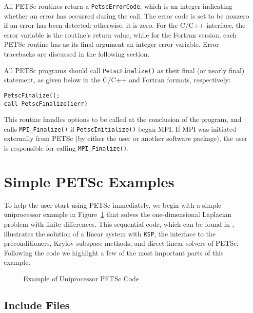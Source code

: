 {{All PETSc routines return a \lstinline{PetscErrorCode}, which is an integer indicating whether an error has
occurred during the call.  The error code is set to be nonzero if an
error has been detected; otherwise, it is zero.  For the C/C++
interface, the error variable is the routine's return value, while for
the Fortran version, each PETSc routine has as its final argument an
integer error variable.  Error tracebacks are discussed in the following
section.

All PETSc programs should call \lstinline{PetscFinalize()}
as their final (or nearly final) statement, as given below in the C/C++
and Fortran formats, respectively:
\begin{lstlisting}
PetscFinalize();
call PetscFinalize(ierr)
\end{lstlisting}
This routine handles options to be called at the conclusion of
the program, and calls \lstinline{MPI_Finalize()} 
if \lstinline{PetscInitialize()}
began MPI. If MPI was initiated externally from PETSc (by either
the user or another software package), the user is
responsible for calling \lstinline{MPI_Finalize()}.

\section{Simple PETSc Examples}

\label{sec_simple}

To help the user start using PETSc immediately, we begin with a simple
uniprocessor example in Figure~\ref{fig_example1} that solves the
one-dimensional Laplacian problem with finite differences.  This
sequential code, which can be found in
,
illustrates the solution of a linear system with \lstinline{KSP}, the
interface to the preconditioners, Krylov subspace methods, and direct
linear solvers of PETSc.  Following the code we highlight a few of the most important
parts of this example.

\begin{figure}[H]
{
  
}
\caption{Example of Uniprocessor PETSc Code}
\label{fig_example1}
\end{figure}

\subsection*{Include Files}

}}
